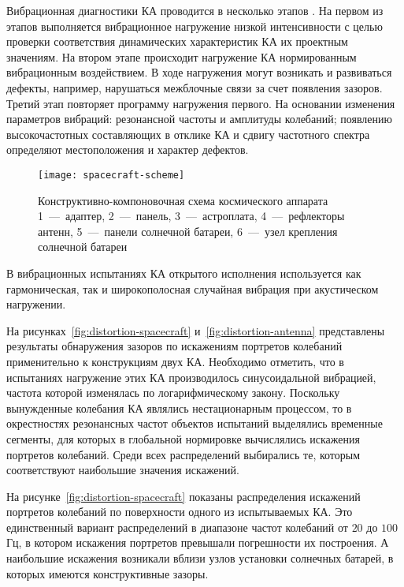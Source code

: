 Вибрационная диагностики КА проводится в несколько этапов \cite{lib:defects:Berns:experience}. На первом из этапов выполняется вибрационное нагружение низкой интенсивности с целью проверки соответствия динамических характеристик КА их проектным значениям. На втором этапе происходит нагружение КА нормированным вибрационным воздействием. В ходе нагружения могут возникать и развиваться дефекты, например, нарушаться межблочные связи за счет появления зазоров. Третий этап повторяет программу нагружения первого. На основании изменения параметров вибраций: резонансной частоты и амплитуды колебаний; появлению высокочастотных составляющих в отклике КА и сдвигу частотного спектра определяют местоположения и характер дефектов.

\begin{figure}[!htb]
	\centerfloat
	\texttt{[image: spacecraft-scheme]}
	\caption{Конструктивно-компоновочная схема космического аппарата \\ 1~---~адаптер, 2~---~панель, 3~---~астроплата, 4~---~рефлекторы антенн, 5~---~панели солнечной батареи, 6~---~узел крепления солнечной батареи} \label{fig:spacecraft-scheme}
\end{figure}

В вибрационных испытаниях КА открытого исполнения используется как гармоническая, так и широкополосная случайная вибрация при акустическом нагружении.

На рисунках~\ref{fig:distortion-spacecraft} и~\ref{fig:distortion-antenna} представлены результаты обнаружения зазоров по искажениям портретов колебаний применительно к конструкциям двух КА. Необходимо отметить, что в испытаниях нагружение этих КА производилось синусоидальной вибрацией, частота которой изменялась по логарифмическому закону. Поскольку вынужденные колебания КА являлись нестационарным процессом, то в окрестностях резонансных частот объектов испытаний выделялись временные сегменты, для которых в глобальной нормировке вычислялись искажения портретов колебаний. Среди всех распределений выбирались те, которым соответствуют наибольшие значения искажений. 

На рисунке~\ref{fig:distortion-spacecraft} показаны распределения искажений портретов колебаний по поверхности одного из испытываемых КА. Это единственный вариант распределений в диапазоне частот колебаний от $ 20 $ до $ 100 $ Гц, в котором искажения портретов превышали погрешности их построения. А наибольшие искажения возникали вблизи узлов установки солнечных батарей, в которых имеются конструктивные зазоры. 

